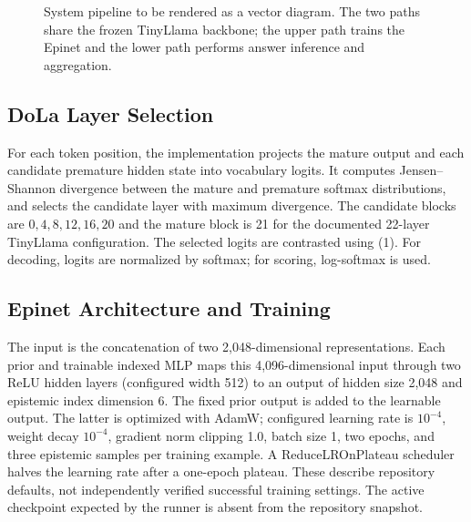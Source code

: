 \documentclass[conference]{IEEEtran}
\begin{document}
\begin{figure}[t]
\centering{}
\caption{System pipeline to be rendered as a vector diagram. The two paths share the frozen TinyLlama backbone; the upper path trains the Epinet and the lower path performs answer inference and aggregation.}
\label{fig:pipeline}
\end{figure}

\subsection{DoLa Layer Selection}
For each token position, the implementation projects the mature output and each candidate premature hidden state into vocabulary logits. It computes Jensen--Shannon divergence between the mature and premature softmax distributions, and selects the candidate layer with maximum divergence. The candidate blocks are $0,4,8,12,16,20$ and the mature block is 21 for the documented 22-layer TinyLlama configuration. The selected logits are contrasted using (1). For decoding, logits are normalized by softmax; for scoring, log-softmax is used.

\subsection{Epinet Architecture and Training}
The input is the concatenation of two 2,048-dimensional representations. Each prior and trainable indexed MLP maps this 4,096-dimensional input through two ReLU hidden layers (configured width 512) to an output of hidden size 2,048 and epistemic index dimension 6. The fixed prior output is added to the learnable output. The latter is optimized with AdamW; configured learning rate is $10^{-4}$, weight decay $10^{-4}$, gradient norm clipping 1.0, batch size 1, two epochs, and three epistemic samples per training example. A ReduceLROnPlateau scheduler halves the learning rate after a one-epoch plateau. These describe repository defaults, not independently verified successful training settings. The active checkpoint expected by the runner is absent from the repository snapshot.
\end{document}
